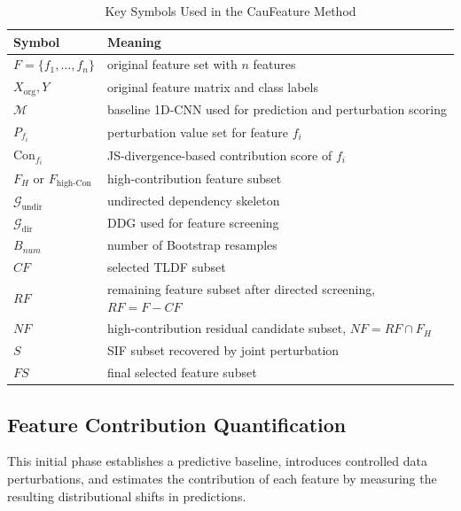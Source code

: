 \documentclass[journal]{IEEEtran}
\begin{document}
\begin{table}[!tbp]
  \setlength{\abovecaptionskip}{0cm}
  \setlength{\belowcaptionskip}{0.1cm}
  \centering
  \scriptsize
  \caption{Key Symbols Used in the CauFeature Method}
  \label{tab:key_symbols}
  \begin{tabular}{@{}p{}p{}@{}}
    \toprule
    \textbf{Symbol} & \textbf{Meaning} \\
    \midrule
    $F=\{f_1,\ldots,f_n\}$ & original feature set with $n$ features \\
    $X_{\text{org}},Y$ & original feature matrix and class labels \\
    $\mathcal{M}$ & baseline 1D-CNN used for prediction and perturbation scoring \\
    $P_{f_i}$ & perturbation value set for feature $f_i$ \\
    $\text{Con}_{f_i}$ & JS-divergence-based contribution score of $f_i$ \\
    $F_H$ or $F_{\text{high-Con}}$ & high-contribution feature subset \\
    $\mathcal{G}_{\text{undir}}$ & undirected dependency skeleton \\
    $\mathcal{G}_{\text{dir}}$ & DDG used for feature screening \\
    $B_{num}$ & number of Bootstrap resamples \\
    $CF$ & selected TLDF subset \\
    $RF$ & remaining feature subset after directed screening, $RF=F-CF$ \\
    $NF$ & high-contribution residual candidate subset, $NF=RF\cap F_H$ \\
    $S$ & SIF subset recovered by joint perturbation \\
    $FS$ & final selected feature subset \\
    \bottomrule
  \end{tabular}
\end{table}

\subsection{Feature Contribution Quantification}
This initial phase establishes a predictive baseline, introduces controlled data perturbations, and estimates the contribution of each feature by measuring the resulting distributional shifts in predictions.
\end{document}
